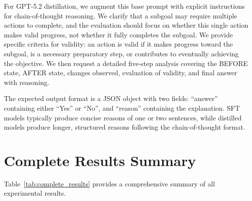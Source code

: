 \documentclass[11pt,a4paper]{article}
\begin{document}
For GPT-5.2 distillation, we augment this base prompt with explicit instructions for chain-of-thought reasoning. We clarify that a subgoal may require multiple actions to complete, and the evaluation should focus on whether this single action makes valid progress, not whether it fully completes the subgoal. We provide specific criteria for validity: an action is valid if it makes progress toward the subgoal, is a necessary preparatory step, or contributes to eventually achieving the objective. We then request a detailed five-step analysis covering the BEFORE state, AFTER state, changes observed, evaluation of validity, and final answer with reasoning.

The expected output format is a JSON object with two fields: ``answer'' containing either ``Yes'' or ``No'', and ``reason'' containing the explanation. SFT models typically produce concise reasons of one or two sentences, while distilled models produce longer, structured reasons following the chain-of-thought format.

\section{Complete Results Summary}

Table~\ref{tab:complete_results} provides a comprehensive summary of all experimental results.
\end{document}
